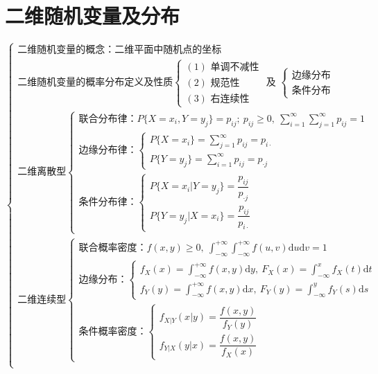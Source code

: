 \documentclass[lang=cn,11pt]{elegantbook}
\begin{document}
\chapter{二维随机变量及分布}
\[
\begin{cases}
\text{二维随机变量的概念：二维平面中随机点的坐标} \\
\text{二维随机变量的概率分布定义及性质}
\begin{cases}
(1) \text{ 单调不减性} \\
(2) \text{ 规范性} \\
(3) \text{ 右连续性}
\end{cases}
\text{ 及 }
\begin{cases}
\text{边缘分布} \\
\text{条件分布}
\end{cases} \\

\text{二维离散型}
\begin{cases}
\text{联合分布律：} P\{X=x_i,Y=y_j\}=p_{ij};\ p_{ij}\geqslant0,\ \sum\limits_{i=1}^{\infty}\sum\limits_{j=1}^{\infty}p_{ij}=1 \\[8pt]
\text{边缘分布律：}
\begin{cases}
P\{X=x_i\}=\sum\limits_{j=1}^{\infty}p_{ij}=p_{i\cdot} \\[8pt]
P\{Y=y_j\}=\sum\limits_{i=1}^{\infty}p_{ij}=p_{\cdot j}
\end{cases} \\[12pt]
\text{条件分布律：}
\begin{cases}
P\{X=x_i|Y=y_j\}=\dfrac{p_{ij}}{p_{\cdot j}} \\[8pt]
P\{Y=y_j|X=x_i\}=\dfrac{p_{ij}}{p_{i\cdot}}
\end{cases}
\end{cases} \\[18pt]

\text{二维连续型}
\begin{cases}
\text{联合概率密度：} f(x,y)\geqslant0,\ \displaystyle\int_{-\infty}^{+\infty}\int_{-\infty}^{+\infty}f(u,v)\mathrm{d}u\mathrm{d}v=1 \\[12pt]
\text{边缘分布：}
\begin{cases}
f_X(x)=\displaystyle\int_{-\infty}^{+\infty}f(x,y)\mathrm{d}y,\ F_X(x)=\displaystyle\int_{-\infty}^{x}f_X(t)\mathrm{d}t \\[12pt]
f_Y(y)=\displaystyle\int_{-\infty}^{+\infty}f(x,y)\mathrm{d}x,\ F_Y(y)=\displaystyle\int_{-\infty}^{y}f_Y(s)\mathrm{d}s
\end{cases} \\[18pt]
\text{条件概率密度：}
\begin{cases}
f_{X|Y}(x|y)=\dfrac{f(x,y)}{f_Y(y)} \\[8pt]
f_{Y|X}(y|x)=\dfrac{f(x,y)}{f_X(x)}
\end{cases}
\end{cases} \\[18pt]


\end{cases}\]
\end{document}
